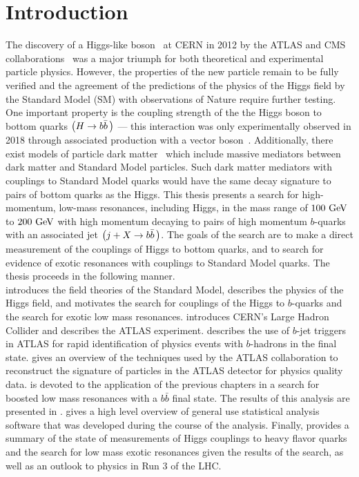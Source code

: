 \chapter{Introduction}\label{chapter:introduction}

The discovery of a Higgs-like boson~\cite{Higgs:1964ia,Higgs:1964pj,Higgs:1966ev,Englert:1964et,Guralnik:1964eu} at CERN in 2012 by the \Gls{ATLAS} and CMS collaborations~\cite{Aad:2012tfa,Chatrchyan:2012xdj} was a major triumph for both theoretical and experimental particle physics.
However, the properties of the new particle remain to be fully verified and the agreement of the predictions of the physics of the Higgs field by the \Gls{Standard Model} (SM) with observations of Nature require further testing.
One important property is the coupling strength of the the Higgs boson to bottom quarks $\left(H \to b\bar{b}\,\right)$ --- this interaction was only experimentally observed in 2018 through associated production with a vector boson~\cite{Aaboud:2018zhk,CMS:2018abb}.
Additionally, there exist models of particle dark matter~\cite{Abdallah:2015ter} which include massive mediators between dark matter and Standard Model particles.
Such \glspl{dark matter mediator} with couplings to Standard Model quarks would have the same decay signature to pairs of bottom quarks as the Higgs.
This thesis presents a search for high-momentum, low-mass resonances, including Higgs, in the mass range of $100~\mathrm{GeV}$ to $200~\mathrm{GeV}$ with high momentum decaying to pairs of high momentum $b$-quarks with an associated jet $\left(j + X \to b\bar{b}\,\right)$.
The goals of the search are to make a direct measurement of the couplings of Higgs to bottom quarks, and to search for evidence of exotic resonances with couplings to Standard Model quarks.
The thesis proceeds in the following manner.\\

 introduces the field theories of the Standard Model, describes the physics of the Higgs field, and motivates the search for couplings of the Higgs to $b$-quarks and the search for exotic low mass resonances.
 introduces CERN's Large Hadron Collider and  describes the ATLAS experiment.
 describes the use of $b$-jet triggers in ATLAS for rapid identification of physics events with $b$-hadrons in the final state.
 gives an overview of the techniques used by the ATLAS collaboration to reconstruct the signature of particles in the ATLAS detector for physics quality data.
 is devoted to the application of the previous chapters in a search for boosted low mass resonances with a $b\bar{b}$ final state.
The results of this analysis are presented in .
 gives a high level overview of general use statistical analysis software that was developed during the course of the analysis.
Finally,  provides a summary of the state of measurements of Higgs couplings to heavy flavor quarks and the search for low mass exotic resonances given the results of the search, as well as an outlook to physics in Run 3 of the LHC.
